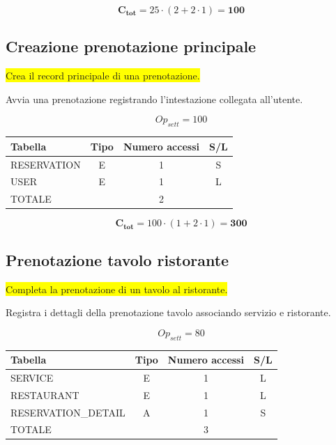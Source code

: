 \documentclass[a4paper,12pt]{report}
\begin{document}
$$\mathbf{C_{tot}} = 25 \cdot (2 + 2 \cdot 1) = \mathbf{100}$$

\subsection*{Creazione prenotazione principale} \label{op13}
\colorbox{yellow}{Crea il record principale di una prenotazione.}

Avvia una prenotazione registrando l'intestazione collegata all'utente.

$$Op_{sett} = 100$$

\begin{table}[H]
  \centering
  \small
  \renewcommand{\arraystretch}{1.15}
  \begin{tabularx}{0.8\textwidth}{|X|c|c|c|}
    \hline
    \rowcolor{gray!20}
    \textbf{Tabella} & \textbf{Tipo} & \textbf{Numero accessi} & \textbf{S/L} \\
    \hline
    RESERVATION & E & 1 & S \\
    USER & E & 1 & L \\
    \hline
    \rowcolor{gray!20}
    TOTALE & & 2 & \\
    \hline
  \end{tabularx}
  \vspace{-1em}
\end{table}

$$\mathbf{C_{tot}} = 100 \cdot (1 + 2 \cdot 1) = \mathbf{300}$$

\subsection*{Prenotazione tavolo ristorante} \label{op14}
\colorbox{yellow}{Completa la prenotazione di un tavolo al ristorante.}

Registra i dettagli della prenotazione tavolo associando servizio e ristorante.

$$Op_{sett} = 80$$

\begin{table}[H]
  \centering
  \small
  \renewcommand{\arraystretch}{1.15}
  \begin{tabularx}{0.8\textwidth}{|X|c|c|c|}
    \hline
    \rowcolor{gray!20}
    \textbf{Tabella} & \textbf{Tipo} & \textbf{Numero accessi} & \textbf{S/L} \\
    \hline
    SERVICE & E & 1 & L \\
    RESTAURANT & E & 1 & L \\
    RESERVATION\_DETAIL & A & 1 & S \\
    \hline
    \rowcolor{gray!20}
    TOTALE & & 3 & \\
    \hline
  \end{tabularx}
  \vspace{-1em}
\end{table}
\end{document}
